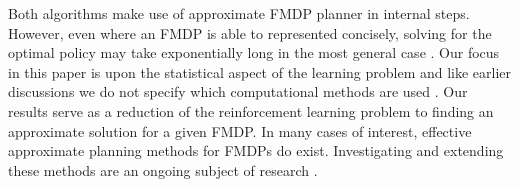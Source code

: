 \documentclass{article}
\begin{document}
Both algorithms make use of approximate FMDP planner in internal steps.
However, even where an FMDP is able to represented concisely, solving for the optimal policy may take exponentially long in the most general case \cite{guestrin2003efficient}.
Our focus in this paper is upon the statistical aspect of the learning problem and like earlier discussions we do not specify which computational methods are used \cite{kearns1999efficient}.
Our results serve as a reduction of the reinforcement learning problem to finding an approximate solution for a given FMDP.
In many cases of interest, effective approximate planning methods for FMDPs do exist.
Investigating and extending these methods are an ongoing subject of research \cite{koller2000policy, guestrin2001max,delgado2011efficient,sanner2012approximate}.




\end{document}
